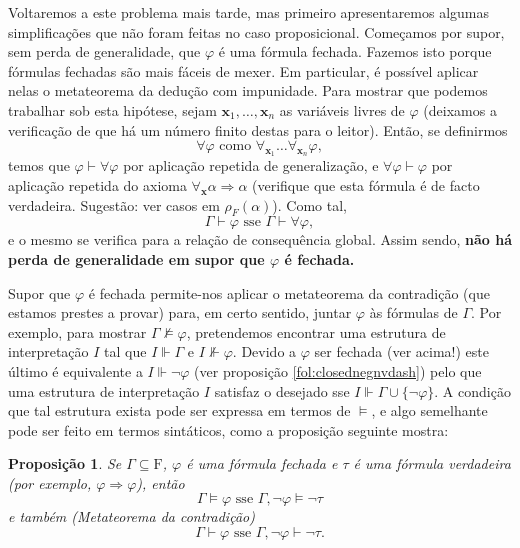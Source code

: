 \documentclass{report}
\newtheorem{prop}{Proposição}
\theoremstyle{definition}
\theoremstyle{remark}
\renewcommand{\bf}[1]{\mathbf{#1}}
\newcommand{\F}{\mathrm{F}}
\newcommand{\imply}{\mathbin{\Rightarrow}}
\begin{document}
	Voltaremos a este problema mais tarde, mas primeiro apresentaremos algumas simplificações que não foram feitas no caso proposicional. Começamos por supor, sem perda de generalidade, que $\varphi$ é uma fórmula fechada. Fazemos isto porque fórmulas fechadas são mais fáceis de mexer. Em particular, é possível aplicar nelas o metateorema da dedução com impunidade. Para mostrar que podemos trabalhar sob esta hipótese, sejam $\bf x_1, \dots, \bf x_n$ as variáveis livres de $\varphi$ (deixamos a verificação de que há um número finito destas para o leitor). Então, se definirmos
	\[\forall \varphi \text{ como } \forall_{\bf x_1} \dots \forall_{\bf x_n} \varphi,\]
	temos que $\varphi \vdash \forall \varphi$ por aplicação repetida de generalização, e $\forall \varphi \vdash \varphi$ por aplicação repetida do axioma $\forall_{\bf x} \alpha \imply \alpha$ (verifique que esta fórmula é de facto verdadeira. Sugestão: ver casos em $\rho_F(\alpha)$). Como tal,
	\[\Gamma \vdash \varphi \text{ sse } \Gamma \vdash \forall \varphi,\]
	e o mesmo se verifica para a relação de consequência global. Assim sendo, \textbf{não há perda de generalidade em supor que $\varphi$ é fechada.}
	
	Supor que $\varphi$ é fechada permite-nos aplicar o metateorema da contradição (que estamos prestes a provar) para, em certo sentido, juntar $\varphi$ às fórmulas de $\Gamma$. Por exemplo, para mostrar $\Gamma \nvDash \varphi$, pretendemos encontrar uma estrutura de interpretação $I$ tal que $I \Vdash \Gamma$ e $I \nVdash \varphi$. Devido a $\varphi$ ser fechada (ver acima!) este último é equivalente a $I \Vdash \neg \varphi$ (ver proposição \ref{fol:closednegnvdash}) pelo que uma estrutura de interpretação $I$ satisfaz o desejado sse $I \Vdash \Gamma \cup \{\neg \varphi\}$. A condição que tal estrutura exista pode ser expressa em termos de $\vDash$, e algo semelhante pode ser feito em termos sintáticos, como a proposição seguinte mostra:
	
	\begin{prop}
	Se $\Gamma \subseteq \F$, $\varphi$ é uma fórmula fechada e $\tau$ é uma fórmula verdadeira (por exemplo, $\varphi \imply \varphi$), então
	\[\Gamma \vDash \varphi \text{ sse } \Gamma, \neg \varphi \vDash \neg \tau\]
	e também (Metateorema da contradição)
	\[\Gamma \vdash \varphi \text{ sse } \Gamma, \neg \varphi \vdash \neg \tau.\]
	\end{prop}
	
\end{document}
